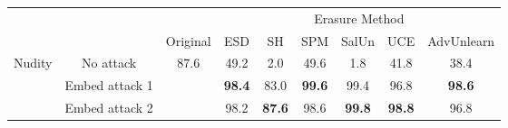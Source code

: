 \begin{tabular}{c|c|c|c|c|c|c|c|c}
        \toprule
        &&& \multicolumn{6}{c}{Erasure Method} \\
        \cmidrule(lr){4-9} 
        && Original & ESD & SH & SPM & SalUn & UCE & AdvUnlearn \\ 
        \midrule
         \multirow{3}{*}{Nudity} & No attack & 87.6 &49.2&2.0&49.6&1.8&41.8 & 38.4\\
        & Embed attack 1 && \textbf{98.4} & 83.0 & \textbf{99.6} & 99.4 & 96.8 & \textbf{98.6} \\
        & Embed attack 2 && 98.2 & \textbf{87.6} & 98.6 & \textbf{99.8} & \textbf{98.8} & 96.8 \\
        \bottomrule
    \end{tabular}